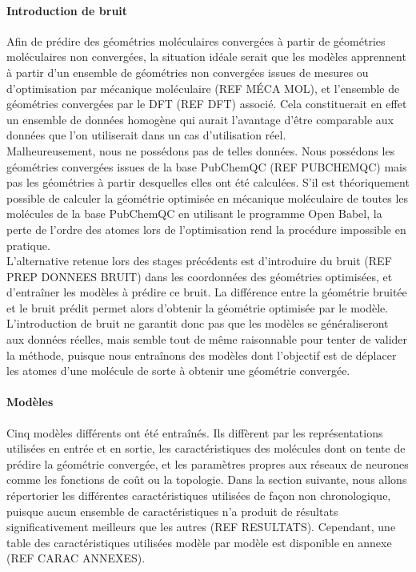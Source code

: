 \paragraph{Introduction de bruit} Afin de prédire des géométries moléculaires convergées à partir de géométries moléculaires non convergées, la situation idéale serait que les modèles apprennent à partir d'un ensemble de géométries non convergées issues de mesures ou d'optimisation par mécanique moléculaire (REF MÉCA MOL), et l'ensemble de géométries convergées par le DFT (REF DFT) associé. Cela constituerait en effet un ensemble de données homogène qui aurait l'avantage d'être comparable aux données que l'on utiliserait dans un cas d'utilisation réel.\\
Malheureusement, nous ne possédons pas de telles données. Nous possédons les géométries convergées issues de la base PubChemQC (REF PUBCHEMQC) mais pas les géométries à partir desquelles elles ont été calculées. S'il est théoriquement possible de calculer la géométrie optimisée en mécanique moléculaire de toutes les molécules de la base PubChemQC en utilisant le programme Open Babel\cite{openbabel}, la perte de l'ordre des atomes lors de l'optimisation rend la procédure impossible en pratique.\\
L'alternative retenue lors des stages précédents est d'introduire du bruit (REF PREP DONNEES BRUIT) dans les coordonnées des géométries optimisées, et d'entraîner les modèles à prédire ce bruit. La différence entre la géométrie bruitée et le bruit prédit permet alors d'obtenir la géométrie optimisée par le modèle. L'introduction de bruit ne garantit donc pas que les modèles se généraliseront aux données réelles, mais semble tout de même raisonnable pour tenter de valider la méthode, puisque nous entraînons des modèles dont l'objectif est de déplacer les atomes d'une molécule de sorte à obtenir une géométrie convergée.

\paragraph{Modèles} Cinq modèles différents ont été entraînés. Ils diffèrent par les représentations utilisées en entrée et en sortie, les caractéristiques des molécules dont on tente de prédire la géométrie convergée, et les paramètres propres aux réseaux de neurones comme les fonctions de coût ou la topologie. Dans la section suivante, nous allons répertorier les différentes caractéristiques utilisées de façon non chronologique, puisque aucun ensemble de caractéristiques n'a produit de résultats significativement meilleurs que les autres (REF RESULTATS). Cependant, une table des caractéristiques utilisées modèle par modèle est disponible en annexe (REF CARAC ANNEXES).